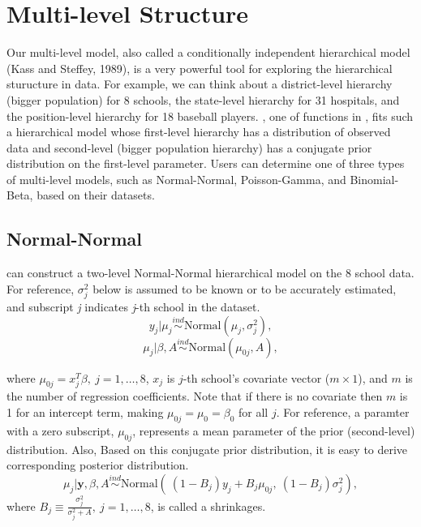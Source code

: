 \documentclass[article]{jss}
\begin{document}
\section[Multi-level Structure]{Multi-level Structure}
Our multi-level model, also called a conditionally independent hierarchical model (Kass and Steffey, 1989), is a very powerful tool for exploring the hierarchical sturucture in data. For example, we can think about a district-level hierarchy (bigger population) for 8 schools, the state-level hierarchy for 31 hospitals, and the position-level hierarchy for 18 baseball players. , one of functions in , fits such a hierarchical model whose first-level hierarchy has a distribution of observed data and second-level (bigger population hierarchy) has a conjugate prior distribution on the first-level parameter. Users can determine one of three types of multi-level models, such as Normal-Normal, Poisson-Gamma, and Binomial-Beta, based on their datasets. 
\\

 
\subsection[Normal-Normal]{Normal-Normal}
 can construct a two-level Normal-Normal hierarchical model on the 8 school data. For reference,  $\sigma^{2}_{j}$ below is assumed to be known or to be accurately estimated, and subscript \emph{j} indicates \emph{j}-th school in the dataset.
\begin{equation}
y_{j}\vert \mu_{j} \stackrel{ind}{\sim}\textrm{Normal}(\mu_{j}, \sigma^{2}_{j}),
\end{equation}
\begin{equation}
\mu_{j}\vert \beta, A\stackrel{ind}{\sim}\textrm{Normal}(\mu_{0j}, A),
\end{equation}

where $\mu_{0j} =x^{T}_{j}\beta,~j=1, \ldots, 8$, $x_{j}$ is $j$-th school's covariate vector ($m\times 1$), and $m$ is the number of regression coefficients. Note that if there is no covariate then $m$ is 1 for an intercept term, making $\mu_{0j}=\mu_{0}=\beta_{0}$ for all $j$. For reference, a paramter with a zero subscript, $\mu_{0j}$, represents a mean parameter of the prior (second-level) distribution. Also,  Based on this conjugate prior distribution, it is easy to derive corresponding posterior distribution.
\begin{equation}
\mu_{j}\vert \textbf{y}, \beta, A \stackrel{ind}{\sim}\textrm{Normal}(~(1-B_{j})y_{j} + B_{j}\mu_{0j},~(1-B_{j})\sigma^{2}_{j}),
\end{equation}
where $B_{j}\equiv\frac{\sigma^{2}_{j}}{\sigma^{2}_{j} + A},~j=1, \ldots, 8$, is called a shrinkages.
\end{document}
